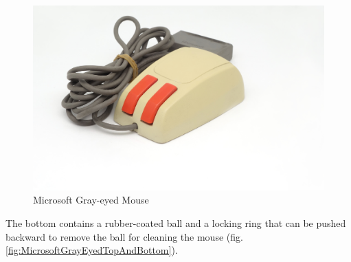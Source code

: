 \documentclass[11pt, a4paper]{article}
\begin{document}
\begin{figure}[h]
   \centering
    \includegraphics[scale=0.35]{1985_microsoft_gray_eyed_mouse/pic_red_30.jpg}
    \caption{Microsoft Gray-eyed Mouse}
    \label{fig:MicrosoftGrayEyedRedPic}
\end{figure}

The bottom contains a rubber-coated ball and a locking ring that can be pushed backward to remove the ball for cleaning the mouse (fig. \ref{fig:MicrosoftGrayEyedTopAndBottom}). 
\end{document}
